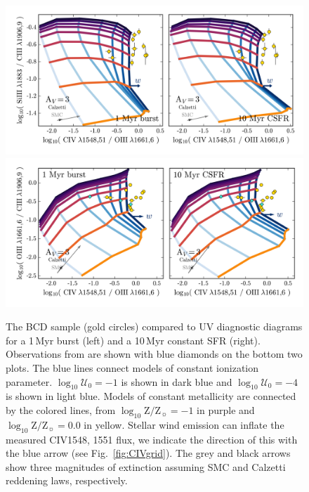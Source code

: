 \documentclass[preprint2,trackchanges]{aastex62}
\newcommand{\Myr}{$\,$Myr\xspace}
\newcommand{\logten}{\ensuremath{\log_{10}}}
\newcommand{\logZeq}[1]{\ensuremath{\logten \mathrm{Z}/\mathrm{Z}_{\sun} = #1}}
\newcommand{\logUeq}[1]{\ensuremath{\logten \mathcal{U}_0 = #1}}
\begin{document}
\begin{figure}
  \begin{center}
    \includegraphics[width=0.98\linewidth]{figs/f15ab.png}\\
    \includegraphics[width=0.98\linewidth]{figs/f15cd.png}
    \caption{The \citet{Berg+2016} BCD sample (gold circles) compared to UV diagnostic diagrams for a 1\Myr burst (left) and a 10\Myr constant SFR (right). Observations from \citet{Senchyna+2017} are shown with blue diamonds on the bottom two plots. The blue lines connect models of constant ionization parameter. \logUeq{-1} is shown in dark blue and \logUeq{-4} is shown in light blue. Models of constant metallicity are connected by the colored lines, from \logZeq{-1} in purple and \logZeq{0.0} in yellow. Stellar wind emission can inflate the measured C\textsc{IV}1548, 1551 flux, we indicate the direction of this with the blue arrow (see Fig.~\ref{fig:CIVgrid}). The grey and black arrows show three magnitudes of extinction assuming SMC and Calzetti reddening laws, respectively.}
    \label{fig:dataDD3}
  \end{center}
\end{figure}
\end{document}

